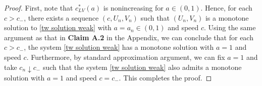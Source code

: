 \documentclass[11pt,a4paper]{article}
\numberwithin{equation}{section}
\numberwithin{figure}{section}
\begin{document}
\begin{proof}
First, note that $c^*_{LV}(a)$ is nonincreasing for $a\in(0,1)$. Hence,
for each $c>c_-$, there exists a sequence $(c, U_n, V_n)$ such that $(U_n, V_n)$ is a monotone solution to \eqref{tw solution weak} with $a=a_n\in(0,1)$ and speed $c$.
Using the same argument as that in {\bf Claim A.2} in the Appendix, we can conclude that 
for each $c>c_-$, the system \eqref{tw solution weak} has a monotone solution with $a=1$ and speed $c$. Furthermore, by standard approximation argument, we can fix $a=1$ and take $c_n\downarrow c_-$
such that the system \eqref{tw solution weak} also admits a monotone solution with $a=1$ and speed $c=c_-$. This completes the proof.


\end{proof}
\end{document}
